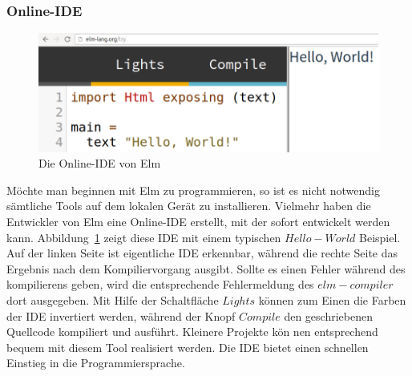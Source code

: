 \subsubsection{Online-IDE}
\label{sec:Online-IDE}
\begin{figure}[h]
	\centering
	\includegraphics[scale=0.4]{img/elm-try.png}
	\caption{Die Online-\ac{IDE} von Elm}\label{fig:elm-try}
\end{figure}
Möchte man beginnen mit Elm zu programmieren, so ist es nicht notwendig sämtliche Tools auf dem lokalen Gerät zu installieren. Vielmehr haben die Entwickler von Elm eine Online-\ac{IDE} erstellt, mit der sofort entwickelt werden kann. Abbildung~\ref{fig:elm-try} zeigt diese \ac{IDE} mit einem typischen $Hello-World$ Beispiel. Auf der linken Seite ist eigentliche \ac{IDE} erkennbar, während die rechte Seite das Ergebnis nach dem Kompiliervorgang ausgibt. Sollte es einen Fehler während des kompilierens geben, wird die entsprechende Fehlermeldung des $elm-compiler$ dort ausgegeben. Mit Hilfe der Schaltfläche $Lights$ können zum Einen die Farben der \ac{IDE} invertiert werden, während der Knopf $Compile$ den geschriebenen Quellcode kompiliert und ausführt. Kleinere Projekte kön	nen entsprechend bequem mit diesem Tool realisiert werden. Die \ac{IDE} bietet einen schnellen Einstieg in die Programmiersprache.

